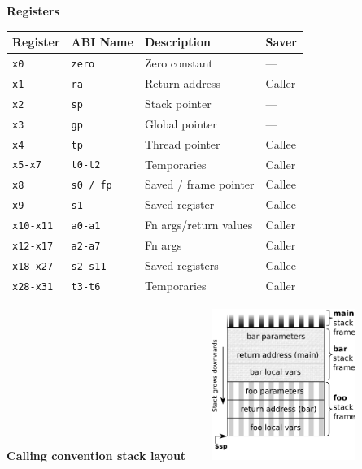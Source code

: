\begin{multicols}{2}
        
\columnbreak

\textbf{Registers}\\
\begin{tabular} {|l | l | l | l|} \hline
Register     & ABI Name     & Description           & Saver  \\ \hline
\tt{x0}      & \tt{zero}    & Zero constant         & ---    \\
\tt{x1}      & \tt{ra}      & Return address        & Caller \\
\tt{x2}      & \tt{sp}      & Stack pointer         & ---    \\
\tt{x3}      & \tt{gp}      & Global pointer        & ---    \\
\tt{x4}      & \tt{tp}      & Thread pointer        & Callee \\
\tt{x5-x7}   & \tt{t0-t2}   & Temporaries           & Caller \\
\tt{x8}      & \tt{s0 / fp} & Saved / frame pointer & Callee \\
\tt{x9}      & \tt{s1}      & Saved register        & Callee \\
\tt{x10-x11} & \tt{a0-a1}   & Fn args/return values & Caller \\
\tt{x12-x17} & \tt{a2-a7}   & Fn args               & Caller \\
\tt{x18-x27} & \tt{s2-s11}  & Saved registers       & Callee \\
\tt{x28-x31} & \tt{t3-t6}   & Temporaries           & Caller \\ \hline
\end{tabular}

\vspace{10ex}
\begin{flushright}
    \textbf{Calling convention stack layout$\qquad$}
    \includegraphics[width=0.35\textwidth]{img/call_stack_diagram.pdf}
\end{flushright}
    
\end{multicols}


